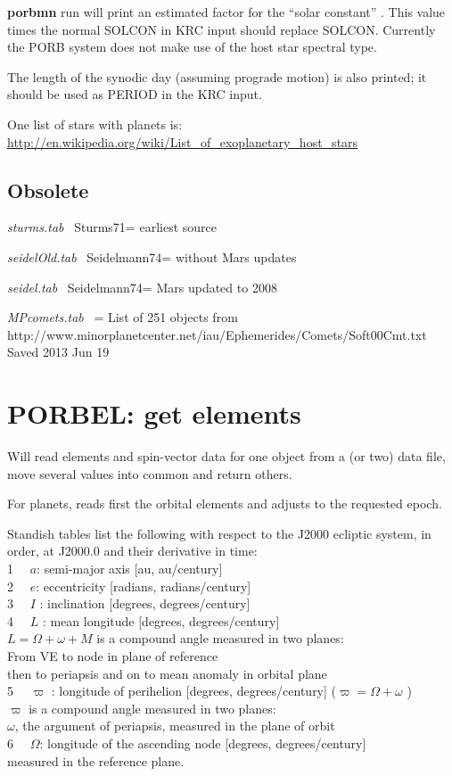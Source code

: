 \documentclass{article}
\newcommand{\np}{\textbf}  %
\newcommand{\qcite}[1]{#1=\cite{#1}}  %
\newcommand{\qi}{\\ \hspace*{2.em}}      %
\newcommand{\qii}{\\ \hspace*{4.em}}     %
\newcommand{\qiii}{\\ \hspace*{6.em}}    %
\begin{document}
\np{porbmn} run will print an estimated factor for the ``solar constant'' . This value times the normal SOLCON in KRC input should replace SOLCON. Currently the PORB system does not make use of the host star spectral type.

The length of the synodic day (assuming prograde motion) is also printed; it should be used as PERIOD in the KRC input. 


One list of stars with planets is: 
\url{http://en.wikipedia.org/wiki/List_of_exoplanetary_host_stars}
\subsection{Obsolete} %

\textit{sturms.tab} \ \qcite{Sturms71} earliest source

\textit{seidelOld.tab} \ \qcite{Seidelmann74}  without Mars updates

\textit{seidel.tab} \ \qcite{Seidelmann74} Mars updated to 2008

\textit{MPcomets.tab} \ \qcite{} List of 251 objects from 
\qi http://www.minorplanetcenter.net/iau/Ephemerides/Comets/Soft00Cmt.txt
\qii Saved 2013 Jun 19 
\section{PORBEL: get elements} %
Will read elements and spin-vector data for one object from a (or two) data file, move several values into common and return others.

For planets, reads first the orbital elements and adjusts to the requested epoch. 

Standish tables list the following with respect to the J2000 ecliptic system, in order, at J2000.0 and their derivative in time:
\qi 1 \ \ $a$: semi-major axis [au, au/century]
\qi 2 \ \ $e$: eccentricity [radians, radians/century]
\qi 3 \ \ $I$ : inclination [degrees, degrees/century]
\qi 4 \ \ $L$ : mean longitude [degrees, degrees/century]
\qii   $L=\Omega +\omega + M$  is a compound angle measured in two planes: 
\qiii From VE to node in plane of reference
\qiii then to periapsis and on to mean anomaly in orbital plane
\qi 5 \ \ $\varpi$ : longitude of perihelion [degrees, degrees/century] ($\varpi= \Omega+ \omega    $ ) 
\qii   $\varpi$ is a compound angle measured in two planes:
\qiii $\omega$, the argument of periapsis, measured in the plane of orbit 
\qi 6 \ \ $\Omega$:  longitude of the ascending node [degrees, degrees/century]
\qii  measured in the reference plane.
\end{document}
